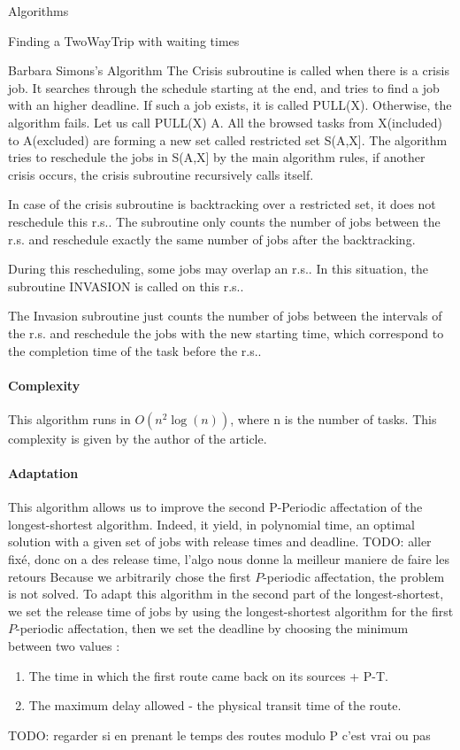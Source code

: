\documentclass[a4paper,10pt]{report}
\newcommand{\todo}[1]{}
\renewcommand{\todo}[1]{{\color{red} TODO: {#1}}}
\begin{document}
\begin{chapter}{Algorithms}
\begin{section}{Finding a TwoWayTrip with waiting times}
\begin{subsection}{Barbara Simons's Algorithm}
The Crisis subroutine is called when there is a crisis job. It searches through the schedule starting at the end,
and tries to find a job with an higher deadline.
If such a job exists, it is called PULL(X). Otherwise, the algorithm fails.
Let us call PULL(X) A.
All the browsed tasks from X(included) to A(excluded) are forming a new set called restricted set S(A,X].
The algorithm tries to reschedule the jobs in S(A,X] by the main algorithm rules, if another crisis occurs, the crisis subroutine recursively calls
itself.

In case of the crisis subroutine is backtracking over a restricted set, it does not reschedule this r.s.. The subroutine only counts
the number of jobs between the r.s. and reschedule exactly the same number of jobs after the backtracking.

During this rescheduling, some jobs may overlap an r.s.. In this situation, the subroutine INVASION is called on this r.s..

The Invasion subroutine just counts the number of jobs between the intervals of the r.s. and reschedule the jobs with the new starting time,
which correspond to the completion time of the task before the r.s..



\paragraph{Complexity}
This algorithm runs in $O(n^2 \log(n))$, where n is the number of tasks. This complexity is given by the author of the article.

\paragraph{Adaptation}
This algorithm allows us to improve the second P-Periodic affectation of the longest-shortest algorithm. 
Indeed, it yield, in polynomial time, an optimal solution with a given set of jobs with release times and deadline. 
\todo{aller fixé, donc on a des release time, l'algo nous donne la meilleur maniere de faire les retours}
Because we arbitrarily chose the first $P$-periodic affectation, the problem is not solved.
To adapt this algorithm in the second part of the longest-shortest, we set the release time of jobs by using the longest-shortest algorithm for
the first $P$-periodic affectation, then we set the deadline by choosing the minimum between two values : 
\begin{enumerate}
 \item The time in which the first route came back on its sources + P-T.
 \item The maximum delay allowed - the physical transit time of the route.
\end{enumerate}
\todo{regarder si en prenant le temps des routes modulo P c'est vrai ou pas}


\end{subsection}
\end{section}
\end{chapter}
\end{document}
